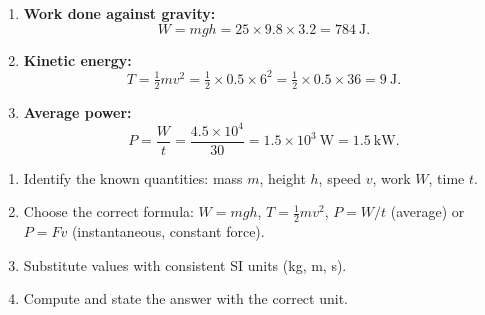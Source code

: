 \documentclass[11pt]{article}
\begin{document}
\begin{corrige}
\begin{enumerate}
\item \textbf{Work done against gravity:}
\[
W = mgh = 25 \times 9.8 \times 3.2 = 784\ \mathrm{J}.
\]

\item \textbf{Kinetic energy:}
\[
T = \tfrac{1}{2}mv^{2} = \tfrac{1}{2}\times 0.5 \times 6^{2} = \tfrac{1}{2}\times 0.5\times 36 = 9\ \mathrm{J}.
\]

\item \textbf{Average power:}
\[
P = \frac{W}{t} = \frac{4.5\times 10^{4}}{30} = 1.5\times 10^{3}\ \mathrm{W} = 1.5\ \mathrm{kW}.
\]
\end{enumerate}

\begin{methode}
\begin{enumerate}
\item Identify the known quantities: mass $m$, height $h$, speed $v$, work $W$, time $t$.
\item Choose the correct formula: $W=mgh$, $T=\frac{1}{2}mv^2$, $P=W/t$ (average) or $P=Fv$ (instantaneous, constant force).
\item Substitute values with consistent SI units (kg, m, s).
\item Compute and state the answer with the correct unit.
\end{enumerate}
\end{methode}
\end{corrige}
\end{document}
